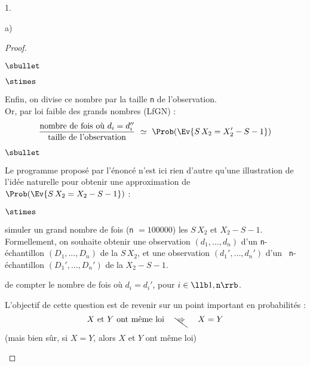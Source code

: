 \documentclass[11pt]{article}%
\begin{document}
\begin{noliste}{1.}
\begin{noliste}{a)}
\begin{proof}
\begin{noliste}{$\sbullet$}
\begin{noliste}{$\stimes$}
          
        \item Enfin, on divise ce nombre par la taille {\tt n} de
          l'observation.\\
          Or, par loi faible des grands nombres (LfGN) :
          \[
            \dfrac{\text{nombre de fois où $d_i = d_i''$}}{\text{taille
                de l'observation}} \ \simeq \ \Prob(\Ev{S \, X_2 = X_2'
              - S-1})
          \]
        \end{noliste}
      \end{noliste}
      \begin{remarkL}{.98}
        \begin{noliste}{$\sbullet$}
        \item Le programme proposé par l'énoncé n'est ici rien d'autre
          qu'une illustration de l'idée naturelle pour obtenir une
          approximation de $\Prob(\Ev{S \, X_2 = X_2 - S-1})$ :
          \begin{noliste}{$\stimes$}
          \item simuler un grand nombre de fois ({\tt n} $= 100000$)
            les \var $S \, X_2$ et $X_2 - S-1$.\\
            Formellement, on souhaite obtenir une observation $(d_1,
            \ldots, d_n)$ d'un {\tt n}-échantillon
            $(D_1, \ldots, D_n)$ de la \var $S \, X_2$, et une
            observation $(d_1', \ldots, d_n')$ d'un {\tt
              n}-échantillon $(D_1', \ldots, D_n')$ de la \var $X_2 -S-1$. 
            
          \item de compter le nombre de fois où $d_i = d_i'$, pour $i
            \in \llb 1, {\tt n} \rrb$.
          \end{noliste}
          
        \item L'objectif de cette question \Scilab{} est de revenir sur
          un point important en probabilités :
          \[
            \mbox{$X$ et $Y$ ont même loi \quad
            \bcancel{\rule[-.2cm]{0cm}{.2cm} \!\!\! $\Rightarrow$ \!\!\!
            \rule[-.2cm]{0cm}{.2cm}} \quad $X=Y$}
          \]
          (mais bien sûr, si $X=Y$, alors $X$ et $Y$ ont même loi)
          

\end{noliste}
\end{remarkL}
\end{proof}
\end{noliste}
\end{noliste}
\end{document}
